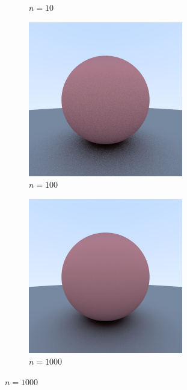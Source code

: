\documentclass[10pt]{IEEEtran}
\begin{document}
\begin{figure}
\begin{subfigure}[b]{0.2\textwidth}
        \caption{$n=10$}
        \label{fig:samples n equals 10}
    \end{subfigure}
    \begin{subfigure}[b]{0.2\textwidth}
        \centering
        \includegraphics[width=\textwidth]{images/sampleCount/100.png}
        \caption{$n=100$}
        \label{fig:samples n equals 100}
    \end{subfigure}
    \begin{subfigure}[b]{0.2\textwidth}
        \centering
        \includegraphics[width=\textwidth]{images/sampleCount/1000.png}
        \caption{$n=1000$}
        \label{fig:samples n equals 1000}
    \end{subfigure}
\end{figure}
\end{document}

